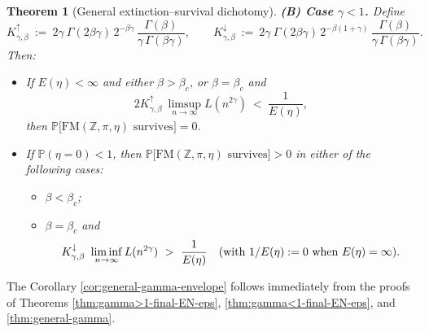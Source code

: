\documentclass[preprint]{imsart}
\newcommand{\1}{\mathbf{1}}
\theoremstyle{plain}
\newtheorem{theorem}{Theorem}[section]
\theoremstyle{definition}
\begin{document}
\begin{theorem}[General extinction–survival dichotomy]
\medskip
\noindent\textbf{(B) Case $\gamma<1$.} Define
\[
K^{\uparrow}_{\gamma,\beta}\ :=\ 2\gamma\ \Gamma(2\beta\gamma)\,2^{-\beta\gamma}\,
\frac{\Gamma(\beta)}{\gamma\,\Gamma(\beta\gamma)},
\qquad
K^{\downarrow}_{\gamma,\beta}\ :=\ 2\gamma\ \Gamma(2\beta\gamma)\,2^{-\beta(1+\gamma)}\,
\frac{\Gamma(\beta)}{\gamma\,\Gamma(\beta\gamma)}.
\]
Then:
\begin{itemize}
\item[(i) \emph{Extinction.}] If $E(\eta)<\infty$ and either $\beta>\beta_c$, or $\beta=\beta_c$ and
\[
2K^{\uparrow}_{\gamma,\beta}\ \limsup_{n\to\infty} L(n^{2\gamma})\ <\ \frac{1}{E(\eta)},
\]
then $\mathbb{P}\big[\mathrm{FM}(\mathbb{Z},\pi,\eta)\text{ survives}\big]=0$.
\item[(ii) \emph{Survival.}] If $\mathbb{P}(\eta=0)<1$, then
$\mathbb{P}\big[\mathrm{FM}(\mathbb{Z},\pi,\eta)\text{ survives}\big]>0$ in either of the following cases:
\begin{itemize}
\item $\beta<\beta_c$;
\item $\beta=\beta_c$ and
\[
K^{\downarrow}_{\gamma,\beta}\ \liminf_{n\to\infty} L(n^{2\gamma})\ >\ \frac{1}{E(\eta)}
\quad \textup{(with $1/E(\eta):=0$ when $E(\eta)=\infty$)}.
\]
\end{itemize}
\end{itemize}


\end{theorem}
The Corollary \ref{cor:general-gamma-envelope} follows immediately from the proofs of Theorems \ref{thm:gamma>1-final-EN-eps}, \ref{thm:gamma<1-final-EN-eps}, and \ref{thm:general-gamma}.
\end{document}

